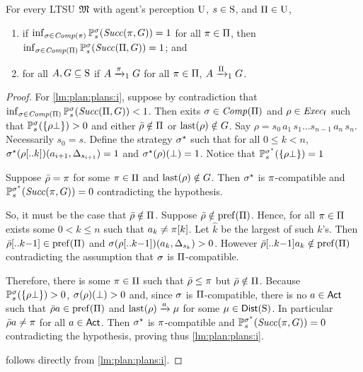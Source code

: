 \begin{lemma}\label{lm:plan:plans}
  For every LTSU $\model$ with agent's perception $\Unc$, $s\in\S$,
  and $\plans\in\Unc$,
  \begin{enumerate}
  \item\label{lm:plan:plans:i}%
    if $\inf_{\strat\in\Comp(\plan)}\Prob^\strat_s(\Succ(\plan,G))=1$
    for all $\plan\in\plans$, then
    $\inf_{\strat\in\Comp(\plans)}\Prob^\strat_s(\Succ(\plans,G))=1$; and
  \item\label{lm:plan:plans:ii}%
    for all $A,G\subseteq\S$ if $A\reach{\plan}_1G$ for all
    $\plan\in\plans$, $A\reach{\plans}_1G$.
  \end{enumerate}

\end{lemma}
%
\begin{proof}
  For \cref{lm:plan:plans:i}, suppose by contradiction that
  $\inf_{\strat\in\Comp(\plans)}\Prob^\strat_s(\Succ(\plans,G))<1$.
  Then exits $\strat\in\Comp(\plans)$ and $\rho\in\execf$ such that
  $\Prob^\strat_s(\{\rho\complete\})>0$ and either
  $\bar{\rho}\notin\plans$ or $\last(\rho)\notin G$.
  Say $\rho=s_0\, a_1\, s_1\ldots s_{n-1}\, a_n\, s_n$.  Necessarily
  $s_0=s$.
  Define the strategy $\strat^\star$ such that for all $0\leq k<n$,
  $\strat^\star(\rho[..k])(a_{i+1},\Dirac_{s_{i+1}})=1$ and
  $\strat^\star(\rho)(\complete)=1$.  Notice that
  $\Prob^{\strat^\star}_s(\{\rho\complete\})=1$

  Suppose $\bar{\rho}=\plan$ for some $\plan\in\plans$ and
  $\last(\rho)\notin G$.  Then $\strat^\star$ is $\plan$-compatible
  and $\Prob^{\strat^\star}_s(\Succ(\plan,G))=0$ contradicting the
  hypothesis.

  So, it must be the case that $\bar{\rho}\notin\plans$.
  Suppose $\bar{\rho}\notin\pref(\plans)$.  Hence, for all
  $\plan\in\plans$ exists some $0<k\leq n$ such that
  $a_k\neq\plan[k]$.  Let $\hat{k}$ be the largest of such $k$'s.
  Then $\bar{\rho}[..k{-}1]\in\pref(\plans)$ and
  $\strat(\rho[..k{-}1])(a_k,\Dirac_{s_k})>0$.  However
  $\bar{\rho}[..k{-}1]a_k\notin\pref(\plans)$ contradicting the
  assumption that $\strat$ is $\plans$-compatible.

  Therefore, there is some $\plan\in\plans$ such that
  $\bar{\rho}\leq\plan$ but $\bar{\rho}\notin\plans$.
  Because $\Prob^\strat_s(\{\rho\complete\})>0$,
  $\strat(\rho)(\complete)>0$ and, since $\strat$ is
  $\plans$-compatible, there is no $a\in\Act$ such that
  $\bar{\rho}a\in\pref(\plans)$ and $\last(\rho)\reach{a}\mu$ for some
  $\mu\in\Dist(\S)$.
  In particular $\bar{\rho}a\neq\plan$ for all $a\in\Act$.  Then
  $\strat^\star$ is $\plan$-compatible and
  $\Prob^{\strat^\star}_s(\Succ(\plan,G))=0$ contradicting the
  hypothesis, proving thus \cref{lm:plan:plans:i}.

   follows directly from \cref{lm:plan:plans:i}.
\end{proof}



